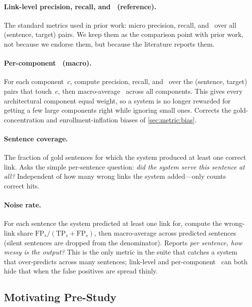 \paragraph{Link-level precision, recall, and \fone\ (reference).}
The standard metrics used in prior work: micro precision, recall, and \fone\ over all (sentence, target) pairs.
We keep them as the comparison point with prior work, not because we endorse them, but because the literature reports them.

\paragraph{Per-component \fone\ (macro).}
For each component~$c$, compute precision, recall, and \fone\ over the (sentence, target) pairs that touch~$c$, then macro-average \fone\ across all components.
This gives every architectural component equal weight, so a system is no longer rewarded for getting a few large components right while ignoring small ones.
Corrects the gold-concentration and enrollment-inflation biases of \autoref{sec:metric:bias}.

\paragraph{Sentence coverage.}
The fraction of gold sentences for which the system produced at least one correct link.
Asks the simple per-sentence question: \emph{did the system serve this sentence at all?}
Independent of how many wrong links the system added---only counts correct hits.

\paragraph{Noise rate.}
For each sentence the system predicted at least one link for, compute the wrong-link share $\text{FP}_s / (\text{TP}_s + \text{FP}_s)$, then macro-average across predicted sentences (silent sentences are dropped from the denominator).
Reports \emph{per sentence, how messy is the output?}
This is the only metric in the suite that catches a system that over-predicts across many sentences; link-level and per-component \fone\ can both hide that when the false positives are spread thinly.

\subsection{Motivating Pre-Study}
\label{sec:metric:prestudy}

